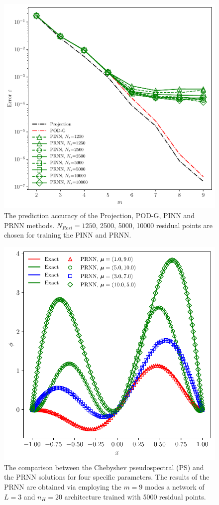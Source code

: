 \documentclass[preprint, 10pt]{elsarticle}
\begin{document}
\begin{figure}[!ht]
  \centering
  \includegraphics[width=12cm]{../../pythonNN/1DBurges/fig/ErrorComparsion_NResi.pdf}
\caption{The prediction accuracy of the Projection, POD-G, PINN and PRNN methods. $N_{Resi}=1250$, 2500, 5000, 10000 residual points are chosen for training the PINN and PRNN.}
\label{fig_1DBurgesErrorComparsion_NResi}
\end{figure}

\begin{figure}[!ht]
  \centering
  \includegraphics[width=12cm]{../../pythonNN/1DBurges/fig/ResultComparsion.pdf}
\caption{The comparison between the Chebyshev pseudospectral (PS) and the PRNN solutions for four specific parameters. The results of the PRNN are obtained via employing the $m=9$ modes a network of $L=3$ and $n_H=20$ architecture trained with 5000 residual points.}
\label{fig_1DBurgesResultComparsion}
\end{figure}
\end{document}
